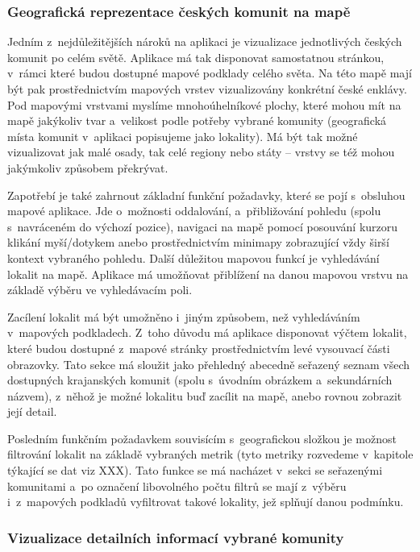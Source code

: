 \hypertarget{geografickuxe1-reprezentace-ux10deskuxfdch-komunit-na-mapux11b}{%
\subsubsection{Geografická reprezentace českých komunit na mapě}\label{geografickuxe1-reprezentace-ux10deskuxfdch-komunit-na-mapux11b}}

Jedním z~nejdůležitějších nároků na aplikaci je vizualizace jednotlivých českých komunit po celém světě. Aplikace má tak disponovat samostatnou stránkou, v~rámci které budou dostupné mapové podklady celého světa. Na této mapě mají být pak prostřednictvím mapových vrstev vizualizovány konkrétní české enklávy. Pod mapovými vrstvami myslíme mnohoúhelníkové plochy, které mohou mít na mapě jakýkoliv tvar a~velikost podle potřeby vybrané komunity (geografická místa komunit v~aplikaci popisujeme jako lokality). Má být tak možné vizualizovat jak malé osady, tak celé regiony nebo státy -- vrstvy se též mohou jakýmkoliv způsobem překrývat.

Zapotřebí je také zahrnout základní funkční požadavky, které se pojí s~obsluhou mapové aplikace. Jde o~možnosti oddalování, a~přibližování pohledu (spolu s~navráceném do výchozí pozice), navigaci na mapě pomocí posouvání kurzoru klikání myší/dotykem anebo prostřednictvím minimapy zobrazující vždy širší kontext vybraného pohledu. Další důležitou mapovou funkcí je vyhledávání lokalit na mapě. Aplikace má umožňovat přiblížení na danou mapovou vrstvu na základě výběru ve vyhledávacím poli.

Zacílení lokalit má být umožněno i~jiným způsobem, než vyhledáváním v~mapových podkladech. Z~toho důvodu má aplikace disponovat výčtem lokalit, které budou dostupné z~mapové stránky prostřednictvím levé vysouvací části obrazovky. Tato sekce má sloužit jako přehledný abecedně seřazený seznam všech dostupných krajanských komunit (spolu s~úvodním obrázkem a~sekundárních názvem), z~něhož je možné lokalitu buď zacílit na mapě, anebo rovnou zobrazit její detail.

Posledním funkčním požadavkem souvisícím s~geografickou složkou je možnost filtrování lokalit na základě vybraných metrik (tyto metriky rozvedeme v~kapitole týkající se dat viz XXX). Tato funkce se má nacházet v~sekci se seřazenými komunitami a~po označení libovolného počtu filtrů se mají z~výběru i~z~mapových podkladů vyfiltrovat takové lokality, jež splňují danou podmínku.

\hypertarget{vizualizace-detailnuxedch-informacuxed-vybranuxe9-komunity}{%
\subsubsection{Vizualizace detailních informací vybrané komunity}\label{vizualizace-detailnuxedch-informacuxed-vybranuxe9-komunity}}

